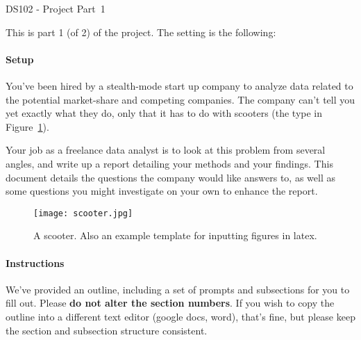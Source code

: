 \documentclass[12pt, answers, addpoints]{exam}
\begin{document}
\begin{center}
    {\Large DS102 - Project Part~1}

    \vspace{0.1in}


    \vspace{0.1in}

\end{center}

This is part 1 (of 2) of the project. The setting is the following:


\paragraph{Setup}
You've been hired by a stealth-mode start up company to analyze data related to the potential market-share and competing companies. The company can't tell you yet exactly what they do, only that it has to do with scooters (the type in Figure~\ref{fig:scooter}). 

Your job as a freelance data analyst is to look at this problem from several angles, and write up a report detailing your methods and your findings. This document details  the questions the company would like answers to, as well as some questions you might investigate on your own to enhance the report.

\begin{figure}[b] %
    \centering
    \texttt{[image: scooter.jpg]}
    \caption{A scooter. Also an example template for inputting figures in latex.}
    \label{fig:scooter}
\end{figure}



\paragraph{Instructions}
We've provided an outline, including a set of prompts and subsections for you to fill out. Please \textbf{do not alter the section numbers}. If you wish to copy the outline into a different text editor (google docs, word), that's fine, but please keep the section and subsection structure consistent. 
\end{document}

